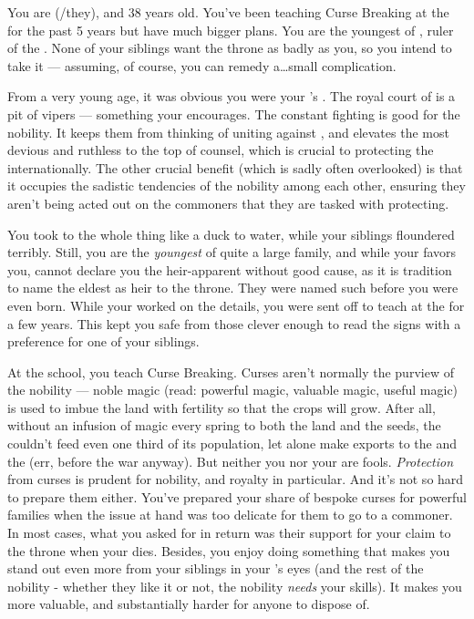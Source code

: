 \documentclass[char]{GL2020}
\begin{document}
\name{\cPrince{}}

You are \cPrince{\intro} (\cPrince{\they}/they), and 38 years old. You've been teaching Curse Breaking at the \pSchool{} for the past 5 years but have much bigger plans. You are the youngest \cPrince{\offspring} of \cQueen{\intro}, ruler of the \pFarm{}. None of your siblings want the throne as badly as you, so you intend to take it — assuming, of course, you can remedy a\ldots{}small complication.

From a very young age, it was obvious you were your \cQueen{\parent}'s \cPrince{\offspring}. The royal court of \pFarm{} is a pit of vipers — something your \cQueen{\parent} encourages. The constant fighting is good for the nobility. It keeps them from thinking of uniting against \cQueen{\them}, and elevates the most devious and ruthless to the top of \cQueen{\their} counsel, which is crucial to protecting the \pFarm{} internationally. The other crucial benefit (which is sadly often overlooked) is that it occupies the sadistic tendencies of the nobility among each other, ensuring they aren’t being acted out on the commoners that they are tasked with protecting. 

You took to the whole thing like a duck to water, while your siblings floundered terribly. Still, you are the \emph{youngest} of quite a large family, and while your \cQueen{\parent} favors you, \cQueen{\they} cannot declare you the heir-apparent without good cause, as it is tradition to name the eldest as heir to the throne. They were named such before you were even born.  While your \cQueen{\parent} worked on the details, you were sent off to teach at the \pSchool{} for a few years. This kept you safe from those clever enough to read the signs with a preference for one of your siblings.

At the school, you teach Curse Breaking. Curses aren't normally the purview of the nobility — noble magic (read: powerful magic, valuable magic, useful magic) is used to imbue the land with fertility so that the crops will grow. After all, without an infusion of magic every spring to both the land and the seeds, the \pFarm{} couldn't feed even one third of its population, let alone make exports to the \pTech{} and the \pShip{} (err, before the war anyway). But neither you nor your \cQueen{\parent} are fools. \emph{Protection} from curses is prudent for nobility, and royalty in particular. And it's not so hard to prepare them either. You've prepared your share of bespoke curses for powerful families when the issue at hand was too delicate for them to go to a commoner. In most cases, what you asked for in return was their support for your claim to the throne when your \cQueen{\parent} dies. Besides, you enjoy doing something that makes you stand out even more from your siblings in your \cQueen{\parent}’s eyes (and the rest of the nobility - whether they like it or not, the nobility \emph{needs} your skills).  It makes you more valuable, and substantially harder for anyone to dispose of.
\end{document}
